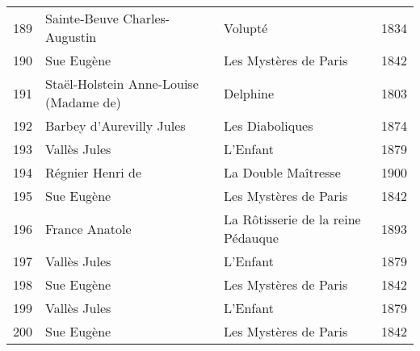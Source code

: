 \begin{center}
\begin{small}
\begin{longtable}{l l l l}
  189 & Sainte-Beuve Charles-Augustin & Volupté & 1834 \\
  190 & Sue Eugène & Les Mystères de Paris & 1842 \\
  191 & Staël-Holstein Anne-Louise (Madame de) & Delphine & 1803 \\
  192 & Barbey d'Aurevilly Jules & Les Diaboliques & 1874 \\
  193 & Vallès Jules & L'Enfant & 1879 \\
  194 & Régnier Henri de & La Double Maîtresse & 1900 \\
  195 & Sue Eugène & Les Mystères de Paris & 1842 \\
  196 & France Anatole & La Rôtisserie de la reine Pédauque & 1893 \\
  197 & Vallès Jules & L'Enfant & 1879 \\
  198 & Sue Eugène & Les Mystères de Paris & 1842 \\
  199 & Vallès Jules & L'Enfant & 1879 \\
  200 & Sue Eugène & Les Mystères de Paris & 1842 \\
  \bottomrule
\end{longtable}
\end{small}
\end{center}
